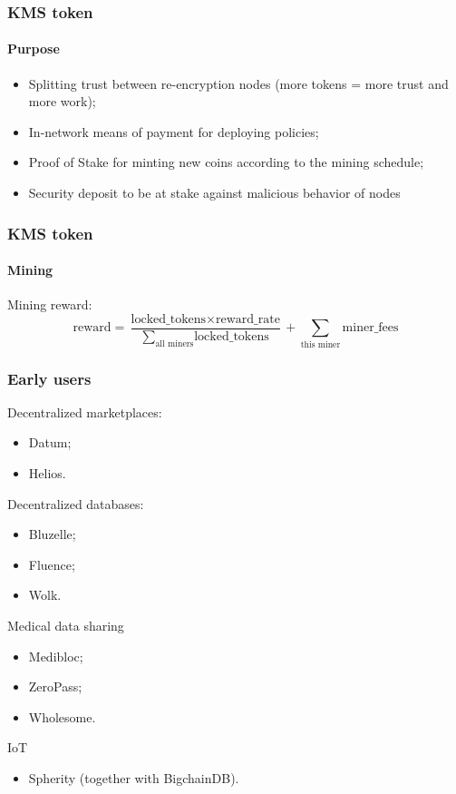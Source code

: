\documentclass[xetex,mathsans,sans]{beamer}
\begin{document}
    \begin{frame}
        \frametitle{KMS token}
        \framesubtitle{Purpose}
        \begin{itemize}
            \item Splitting trust between re-encryption nodes (more tokens = more trust and more work);
            \item In-network means of payment for deploying policies;
            \item Proof of Stake for minting new coins according to the mining schedule;
            \item Security deposit to be at stake against malicious behavior of nodes
        \end{itemize}
    \end{frame}

    \begin{frame}
        \frametitle{KMS token}
        \framesubtitle{Mining}
        Mining reward:
        $$\text{reward} = \frac{\text{locked\_tokens} \times \text{reward\_rate}}{\sum_{\text{all miners}} {\text{locked\_tokens}}} + \sum_{\text{this miner}} {\text{miner\_fees}}$$
    \end{frame}

    \begin{frame}
        \frametitle{Early users}
        Decentralized marketplaces:
        \begin{itemize}
            \item Datum;
            \item Helios.
        \end{itemize}
        Decentralized databases:
        \begin{itemize}
            \item Bluzelle;
            \item Fluence;
            \item Wolk.
        \end{itemize}
        Medical data sharing
        \begin{itemize}
            \item Medibloc;
            \item ZeroPass;
            \item Wholesome.
        \end{itemize}
        IoT
        \begin{itemize}
            \item Spherity (together with BigchainDB).
        \end{itemize}
    \end{frame}
\end{document}
